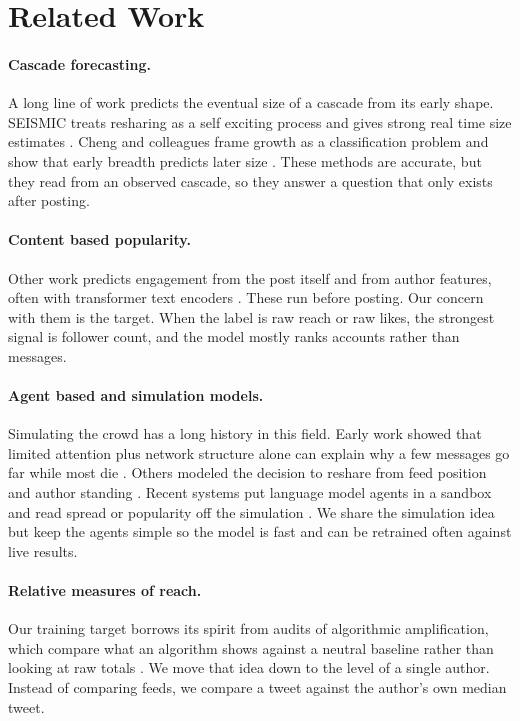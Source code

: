 \documentclass[11pt]{article}
\begin{document}
\section{Related Work}

\paragraph{Cascade forecasting.}
A long line of work predicts the eventual size of a cascade from its early
shape. SEISMIC treats resharing as a self exciting process and gives strong real
time size estimates \cite{zhao2015seismic}. Cheng and colleagues frame growth as
a classification problem and show that early breadth predicts later size
\cite{cheng2014cascades}. These methods are accurate, but they read from an
observed cascade, so they answer a question that only exists after posting.

\paragraph{Content based popularity.}
Other work predicts engagement from the post itself and from author features,
often with transformer text encoders \cite{rameez2022viralbert}. These run
before posting. Our concern with them is the target. When the label is raw reach
or raw likes, the strongest signal is follower count, and the model mostly
ranks accounts rather than messages.

\paragraph{Agent based and simulation models.}
Simulating the crowd has a long history in this field. Early work showed that
limited attention plus network structure alone can explain why a few messages go
far while most die \cite{weng2012competition}. Others modeled the decision to
reshare from feed position and author standing \cite{pezzoni2013retweet}. Recent
systems put language model agents in a sandbox and read spread or popularity off
the simulation \cite{liu2025popsim,park2023agents}. We share the simulation idea
but keep the agents simple so the model is fast and can be retrained often
against live results.

\paragraph{Relative measures of reach.}
Our training target borrows its spirit from audits of algorithmic amplification,
which compare what an algorithm shows against a neutral baseline rather than
looking at raw totals \cite{huszar2022amplification}. We move that idea down to
the level of a single author. Instead of comparing feeds, we compare a tweet
against the author's own median tweet.
\end{document}
